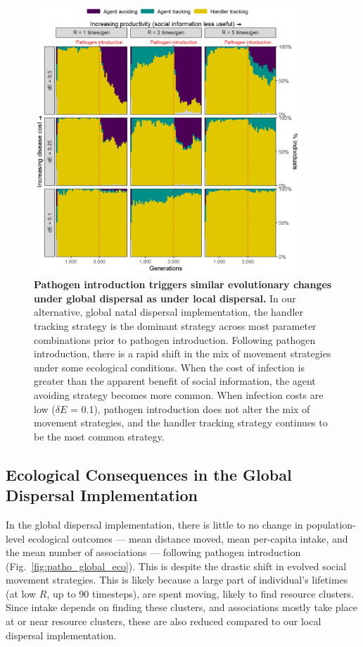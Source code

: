 \begin{figure}
    \centering
    \includegraphics[width=0.9\textwidth]{figures/pathomove/fig_evo_change_global_dispersal.png}
    \caption{
        \textbf{Pathogen introduction triggers similar evolutionary changes under global dispersal as under local dispersal.} In our alternative, global natal dispersal implementation, the handler tracking strategy is the dominant strategy across most parameter combinations prior to pathogen introduction. Following pathogen introduction, there is a rapid shift in the mix of movement strategies under some ecological conditions. When the cost of infection is greater than the apparent benefit of social information, the agent avoiding strategy becomes more common. When infection costs are low ($\delta E$ = 0.1), pathogen introduction does not alter the mix of movement strategies, and the handler tracking strategy continues to be the most common strategy.}
    \label{fig:patho_evo_global}
\end{figure}

\subsection*{Ecological Consequences in the Global Dispersal Implementation}

In the global dispersal implementation, there is little to no change in population-level ecological outcomes --- mean distance moved, mean per-capita intake, and the mean number of associations --- following pathogen introduction (Fig.~\ref{fig:patho_global_eco}).
This is despite the drastic shift in evolved social movement strategies.
This is likely because a large part of individual's lifetimes (at low $R$, up to 90 timesteps), are spent moving, likely to find resource clusters.
Since intake depends on finding these clusters, and associations mostly take place at or near resource clusters, these are also reduced compared to our local dispersal implementation.

